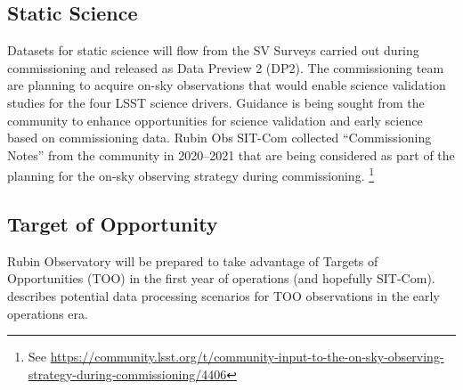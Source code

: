 \subsection{Static Science}

Datasets for static science will flow from the SV Surveys carried out during commissioning and released as Data Preview 2 (DP2).
The commissioning team are planning to acquire on-sky observations that would enable science validation studies for the four LSST science drivers.
Guidance is being sought from the community to enhance opportunities for science validation and early science  based on commissioning data.
Rubin Obs SIT-Com collected ``Commissioning Notes'' from the community in 2020--2021 that are being considered as part of the
planning for the on-sky observing strategy during commissioning. \footnote {See \url{https://community.lsst.org/t/community-input-to-the-on-sky-observing-strategy-during-commissioning/4406}}


\subsection{Target of Opportunity}

Rubin Observatory will be prepared to take advantage of Targets of Opportunities (TOO) in the first year of operations (and hopefully SIT-Com).
 describes potential data processing scenarios for TOO observations in the early operations era.
